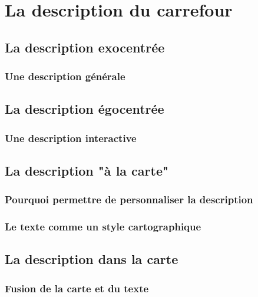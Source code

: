 \chapter{La description du carrefour}

\todo{}

\section{La description exocentrée}

\todo{}

\subsection{Une description générale}

\todo{}

\section{La description égocentrée}

\todo{}

\subsection{Une description interactive}

\todo{}

\section{La description "à la carte"}

\todo{}

\subsection{Pourquoi permettre de personnaliser la description}

\todo{}

\subsection{Le texte comme un style cartographique}

\todo{}

\section{La description dans la carte}

\todo{}

\subsection{Fusion de la carte et du texte}

\todo{}